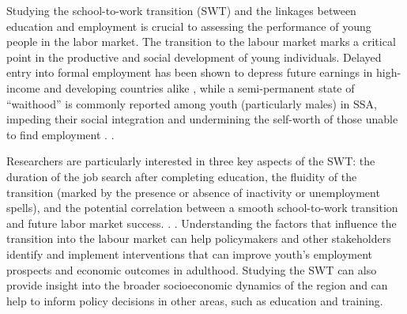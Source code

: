 \documentclass[
  a4paper, twoside, 12pt]{book}
\renewcommand{\hl}[1]{#1}
\newcommand{\hlc}[2][color]{}
\begin{document}
\hl{Studying the school-to-work transition (SWT) and the linkages between education and employment is crucial to assessing the performance of young people in the labor market.} The transition to the labour market marks a critical point in the productive and social development of young individuals. Delayed entry into formal employment has been shown to depress future earnings in high-income and developing countries alike \autocite{bridges2017}, while a semi-permanent state of ``waithood'' is commonly reported among youth (particularly males) in SSA, impeding their social integration and undermining the self-worth of those unable to find employment \autocite{mains2011,honwana2012}. \hlc[lightgray]{Those youth who find work tend to be underemployed and in informal jobs, leading to youth poverty, exacerbating inequality, and fostering unrest and conflict, raising the possibility of youth unrest observed elsewhere in the world }\autocite{urdal2006,mains2011}.

\hl{Researchers are particularly interested in three key aspects of the SWT: the duration of the job search after completing education, the fluidity of the transition (marked by the presence or absence of inactivity or unemployment spells), and the potential correlation between a smooth school-to-work transition and future labor market success.} \hlc[lightgray]{Both the age of school-leaving and the speed of transition to the labour market are of particular interest to policy makers in SSA, where young people (aged 15-24) suffer over twice the unemployment rate of adults, albeit with high variation across countries }\autocite{africandevelopmentbank2016a}. \hlc[lightgray]{A delayed entry into the labour force can reduce youths' lifetime labour market participation and contribution to the economy, while slow transition can result in employment "scarring": early periods of underemployment and unemployment that lead to wage losses and reduce the likelihood of returning to the labour force. Evidence from high-income countries suggests that protracted unemployment spells, including extended school-to-work transitions, negatively affect future earnings and employment prospects} \autocite{schmillen2017,emmenegger2017,moller2015,cockx2012}. \hl{Understanding the factors that influence the transition into the labour market can help policymakers and other stakeholders identify and implement interventions that can improve youth's employment prospects and economic outcomes in adulthood. Studying the SWT can also provide insight into the broader socioeconomic dynamics of the region and can help to inform policy decisions in other areas, such as education and training.}
\end{document}
